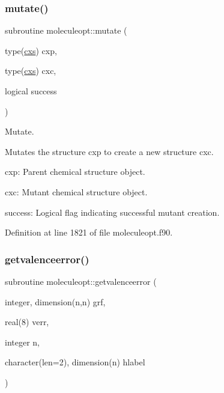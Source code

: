 \subsubsection{\texorpdfstring{mutate()}{mutate()}}
{\footnotesize\ttfamily subroutine moleculeopt\+::mutate (\begin{DoxyParamCaption}\item[{type(\mbox{\hyperlink{structchemstr_1_1cxs}{cxs}})}]{cxp,  }\item[{type(\mbox{\hyperlink{structchemstr_1_1cxs}{cxs}})}]{cxc,  }\item[{logical}]{success }\end{DoxyParamCaption})}



Mutate. 

Mutates the structure cxp to create a new structure cxc.


\begin{DoxyItemize}
\item cxp\+: Parent chemical structure object.
\item cxc\+: Mutant chemical structure object.
\item success\+: Logical flag indicating successful mutant creation. 
\end{DoxyItemize}

Definition at line 1821 of file moleculeopt.\+f90.

\mbox{\label{namespacemoleculeopt_a280e267a5ce24d0ef0f1d90cafeef35a}} 
\subsubsection{\texorpdfstring{getvalenceerror()}{getvalenceerror()}\hspace{0.1cm}{\footnotesize\ttfamily [2/2]}}
{\footnotesize\ttfamily subroutine moleculeopt\+::getvalenceerror (\begin{DoxyParamCaption}\item[{integer, dimension(n,n)}]{grf,  }\item[{real(8)}]{verr,  }\item[{integer}]{n,  }\item[{character(len=2), dimension(n)}]{hlabel }\end{DoxyParamCaption})}



